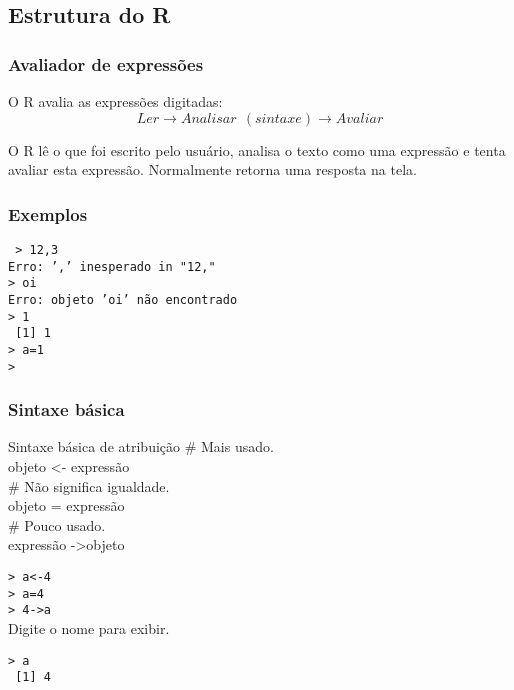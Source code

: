 \documentclass[handout]{beamer}
\begin{document}
 \subsection{Estrutura do R}
 \begin{frame}
   \frametitle{Avaliador de expressões}
   \begin{center}
      O R avalia as expressões digitadas:
\pause
      \[ Ler \rightarrow Analisar ~ ~(sintaxe)  \rightarrow Avaliar \]
\pause
     \end{center}
     O R lê o que foi escrito pelo usuário, analisa o texto como uma expressão e tenta avaliar esta expressão. Normalmente retorna uma resposta na tela.
 
 
 \end{frame}
 \begin{frame}
   \frametitle{Exemplos}
          \texttt{
            > 12,3 \\
            Erro: ',' inesperado in "12," \\
\pause
            > oi \\
            Erro: objeto 'oi' não encontrado \\
\pause
             > 1 \\
            ~[1] 1 \\ 
\pause
            > a=1 \\
            >}  
 \end{frame}

 \begin{frame}
   \frametitle{Sintaxe básica}
   \begin{block}{Sintaxe básica de atribuição}
     \# Mais usado. \\
     objeto \textless- expressão  \\ \vspace{10pt}
    \# Não significa igualdade.\\
    objeto = expressão \\ \vspace{10pt} 
    \# Pouco usado.\\
    expressão -\textgreater objeto \hspace{10pt}        
   \end{block}
\pause
    \texttt{> a<-4\\
           > a=4 \\
           > 4->a\\}
 \pause
\vspace{8pt}
 Digite o nome para exibir.

      \texttt{> a \\
              ~[1] 4}
 \end{frame}
\end{document}
